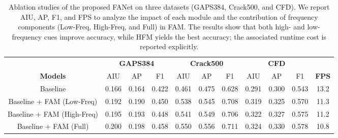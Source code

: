 \documentclass[journal]{IEEEtran}
\begin{document}
\begin{table}[!t]
\centering
\caption{{Ablation studies of the proposed FANet on three datasets (GAPS384, Crack500, and CFD).
We report AIU, AP, F1, and FPS to analyze the impact of each module and the contribution of frequency components (Low-Freq, High-Freq, and Full) in FAM.
The results show that both high- and low-frequency cues improve accuracy, while HFM yields the best accuracy; the associated runtime cost is reported explicitly.}}
\begin{tabular}{@{}c|ccc|ccc|ccc|c@{}}
\toprule
                                  & \multicolumn{3}{c|}{\textbf{GAPS384}}                                                      & \multicolumn{3}{c|}{\textbf{Crack500}}                                                     & \multicolumn{3}{c|}{\textbf{CFD}}                                                          &                                \\ \cmidrule(lr){2-10}
\multirow{-2}{*}{\textbf{Models}} & AIU                          & AP                           & F1                           & AIU                          & AP                           & F1                           & AIU                          & AP                           & F1                           & \multirow{-2}{*}{\textbf{FPS}} \\ \midrule
Baseline                          & 0.166                        & 0.164                        & 0.422                        & 0.461                        & 0.475                        & 0.628                        & 0.291                        & 0.300                          & 0.543                        & 13.2                           \\
Baseline + FAM (Low-Freq)         & 0.192                        & 0.190                         & 0.450                        & 0.538                        & 0.545                        & 0.708                        & 0.319                        & 0.325                        & 0.570                         & 11.3                           \\
Baseline + FAM (High-Freq)        & 0.195                        & 0.193                        & 0.448                        & 0.541                        & 0.549                        & 0.706                        & 0.322                        & 0.327                        & 0.575                        & 11.2                           \\
Baseline + FAM (Full)             & 0.200                          & 0.198                        & 0.458                        & 0.550                         & 0.556                        & 0.711                        & 0.324                        & 0.330                         & 0.578                        & 10.8                           \\

\end{tabular}
\end{table}
\end{document}
